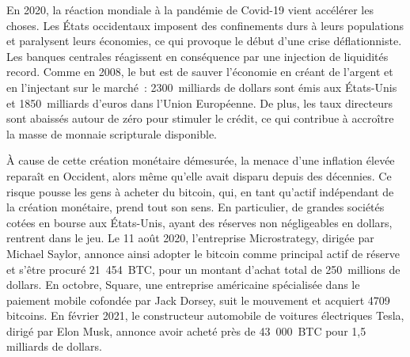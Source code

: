 En 2020, la réaction mondiale à la pandémie de Covid-19 vient accélérer les choses. Les États occidentaux imposent des confinements durs à leurs populations et paralysent leurs économies, ce qui provoque le début d'une crise déflationniste. Les banques centrales réagissent en conséquence par une injection de liquidités record. Comme en 2008, le but est de sauver l'économie en créant de l'argent et en l'injectant sur le marché~: 2300~milliards de dollars sont émis aux États-Unis et 1850~milliards d'euros dans l'Union Européenne. De plus, les taux directeurs sont abaissés autour de zéro pour stimuler le crédit, ce qui contribue à accroître la masse de monnaie scripturale disponible.

À cause de cette création monétaire démesurée, la menace d'une inflation élevée reparaît en Occident, alors même qu'elle avait disparu depuis des décennies. Ce risque pousse les gens à acheter du bitcoin, qui, en tant qu'actif indépendant de la création monétaire, prend tout son sens. En particulier, de grandes sociétés cotées en bourse aux États-Unis, ayant des réserves non négligeables en dollars, rentrent dans le jeu. Le 11 août 2020, l'entreprise Microstrategy, dirigée par Michael Saylor, annonce ainsi adopter le bitcoin comme principal actif de réserve et s'être procuré 21~454~BTC, pour un montant d'achat total de 250~millions de dollars. En octobre, Square, une entreprise américaine spécialisée dans le paiement mobile cofondée par Jack Dorsey, suit le mouvement et acquiert 4709 bitcoins. En février 2021, le constructeur automobile de voitures électriques Tesla, dirigé par Elon Musk, annonce avoir acheté près de 43~000~BTC pour 1,5 milliards de dollars.

